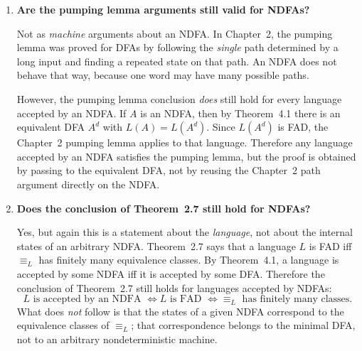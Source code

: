 \begin{enumerate}[{4.}1.]
\begin{enumerate}[(a)]
  \item \emph{DFA (connected portion only).}  From Figure~4.11, the NDFA has
  start states $\{q_1,q_3\}$ and only one final state, $q_0$.  Its nonempty
  transitions are
  \[
  \delta(q_1,\pmb{a})=\{q_1,q_0\},\qquad \delta(q_1,\pmb{b})=\{q_1\},
  \]
  \[
  \delta(q_2,\pmb{b})=\{q_2,q_0\},\qquad
  \delta(q_3,\pmb{a})=\{q_3,q_2\},\qquad
  \delta(q_3,\pmb{b})=\{q_3\}.
  \]
  Starting from $Q_0=\{q_1,q_3\}$, Definition~4.5 gives
  \[
  \delta^d(Q_0,\pmb{a})=\{q_0,q_1,q_2,q_3\}=Q_1,\qquad
  \delta^d(Q_0,\pmb{b})=\{q_1,q_3\}=Q_0.
  \]
  From $Q_1$ we get
  \[
  \delta^d(Q_1,\pmb{a})=Q_1,\qquad \delta^d(Q_1,\pmb{b})=Q_1.
  \]
  Therefore the connected DFA has just two states:
  \[
  Q_0=\{q_1,q_3\}\quad\text{(nonfinal)},\qquad
  Q_1=\{q_0,q_1,q_2,q_3\}\quad\text{(final)},
  \]
  with transition table
  \[
  \begin{array}{c|cc}
   & \pmb{a} & \pmb{b}\\\hline
  Q_0 & Q_1 & Q_0\\
  Q_1 & Q_1 & Q_1
  \end{array}
  \]
\end{enumerate}

\item \textbf{Are the pumping lemma arguments still valid for NDFAs?}

Not as \emph{machine} arguments about an NDFA.  In Chapter~2, the pumping lemma
was proved for DFAs by following the \emph{single} path determined by a long
input and finding a repeated state on that path.  An NDFA does not behave that
way, because one word may have many possible paths.

However, the pumping lemma conclusion \emph{does} still hold for every language
accepted by an NDFA.  If $A$ is an NDFA, then by Theorem~4.1 there is an
equivalent DFA $A^d$ with $L(A)=L(A^d)$.  Since $L(A^d)$ is FAD, the Chapter~2
pumping lemma applies to that language.  Therefore any language accepted by an
NDFA satisfies the pumping lemma, but the proof is obtained by passing to the
equivalent DFA, not by reusing the Chapter~2 path argument directly on the NDFA.

\item \textbf{Does the conclusion of Theorem~2.7 still hold for NDFAs?}

Yes, but again this is a statement about the \emph{language}, not about the
internal states of an arbitrary NDFA.  Theorem~2.7 says that a language $L$ is
FAD iff $\equiv_L$ has finitely many equivalence classes.  By Theorem~4.1, a
language is accepted by some NDFA iff it is accepted by some DFA.  Therefore
the conclusion of Theorem~2.7 still holds for languages accepted by NDFAs:
\[
L \text{ is accepted by an NDFA }
\Leftrightarrow
L \text{ is FAD }
\Leftrightarrow
\equiv_L \text{ has finitely many classes.}
\]
What does \emph{not} follow is that the states of a given NDFA correspond to the
equivalence classes of $\equiv_L$; that correspondence belongs to the minimal
DFA, not to an arbitrary nondeterministic machine.


\end{enumerate}
